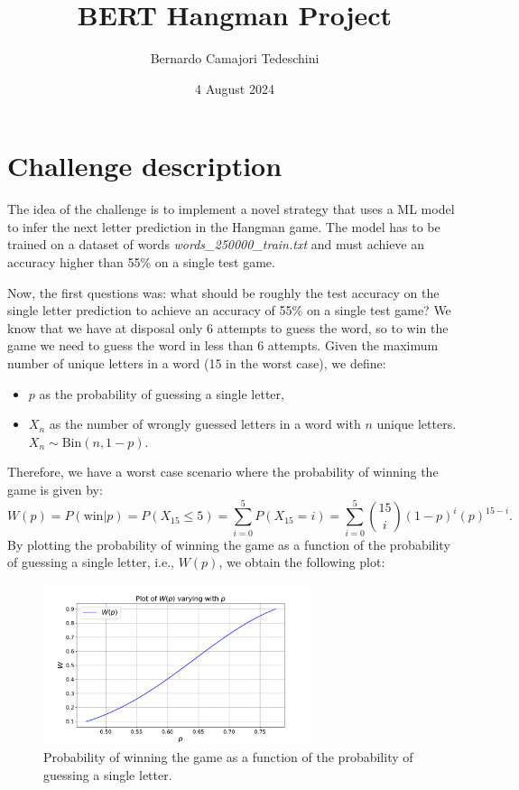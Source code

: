 \documentclass{report}
\begin{document}
\title{BERT Hangman Project}
\author{Bernardo Camajori Tedeschini}
\date{4 August 2024}

\maketitle

\section*{Challenge description}
The idea of the challenge is to implement a novel strategy that uses a \ac{ML}
model to infer the next letter prediction in the Hangman game. 
The model has to be trained on a dataset of words \textit{words\_250000\_train.txt} and must achieve an accuracy higher than
55\% on a single test game. 

Now, the first questions was: what should be roughly the test accuracy on the single letter prediction to achieve an accuracy of 
55\% on a single test game? We know that we have at disposal only 6 attempts to guess the word, so to win the game 
we need to guess the word in less than 6 attempts. 
Given the maximum number of unique letters in a word (15 in the worst case), we define:
\begin{itemize}
    \item $p$ as the probability of guessing a single letter,
    \item $X_n$ as the number of wrongly guessed letters in a word with $n$ unique letters. \\ ${X_n \sim \text{Bin}(n, 1-p)}$.
\end{itemize}
Therefore, we have a worst case scenario where the probability of winning the game is given by:
\begin{equation}
    W(p) = P(\text{win} | p) = P(X_{15} \le 5)= \sum_{i=0}^{5} P(X_{15} = i) = \sum_{i=0}^{5} \binom{15}{i} (1-p)^i (p)^{15-i}.
\end{equation}
By plotting the probability of winning the game as a function of the probability 
of guessing a single letter, i.e., $W(p)$, we obtain the following plot:
\begin{figure}[!h]
    \centering
    \includegraphics[width=0.7\textwidth]{figures/Figure_1.pdf}
    \caption{Probability of winning the game as a function of the probability of guessing a single letter.}
\end{figure}
\end{document}
